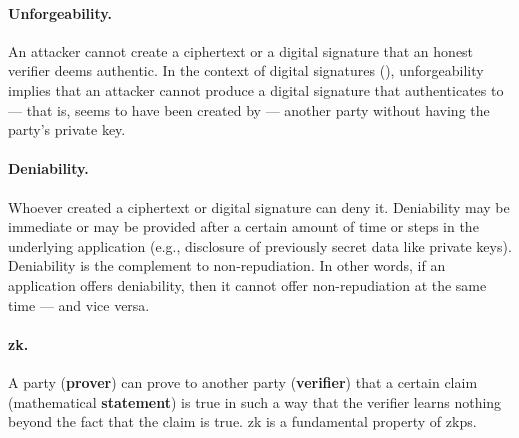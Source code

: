 \paragraph*{Unforgeability.} An attacker cannot create a ciphertext or a digital signature that an honest verifier deems authentic. In the context of digital signatures (), unforgeability implies that an attacker cannot produce a digital signature that authenticates to --- that is, seems to have been created by --- another party without having the party's private key.


\paragraph*{Deniability.} Whoever created a ciphertext or digital signature can deny it. Deniability may be immediate or may be provided after a certain amount of time or steps in the underlying application (e.g., disclosure of previously secret data like private keys). Deniability is the complement to non-repudiation. In other words, if an application offers deniability, then it cannot offer non-repudiation at the same time --- and vice versa.

\paragraph*{\gls{zk}.} A party (\textbf{prover}) can prove to another party (\textbf{verifier}) that a certain claim (mathematical \textbf{statement}) is true in such a way that the verifier learns nothing beyond the fact that the claim is true. \gls{zk} is a fundamental property of \glspl{zkp}.

